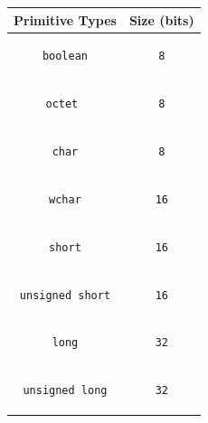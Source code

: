 \begin{table}
\begin{center}
{\small
\begin{tabular}{|c|c|}
\hline 
{\textbf{Primitive Types}} &  \textbf{ Size (bits) }\\ 
\hline 
\begin{lstlisting}
boolean
\end{lstlisting} & 
\begin{lstlisting}
8
\end{lstlisting} \\ \hline 
\begin{lstlisting}
octet 
\end{lstlisting}  & 
\begin{lstlisting}
8
\end{lstlisting} \\ \hline 
\begin{lstlisting} 
char
\end{lstlisting}   & 
\begin{lstlisting}
8
\end{lstlisting} \\ \hline 
\begin{lstlisting}
wchar
\end{lstlisting}   &
\begin{lstlisting}
16
\end{lstlisting} \\ \hline 
\begin{lstlisting}
short
\end{lstlisting}   &
\begin{lstlisting}
16
\end{lstlisting} \\ \hline 
\begin{lstlisting}
unsigned short
\end{lstlisting}  & 
\begin{lstlisting}
16
\end{lstlisting} \\ \hline 
\begin{lstlisting}
long
\end{lstlisting}  &
\begin{lstlisting}
32
\end{lstlisting} \\ \hline 

\begin{lstlisting}
unsigned long
\end{lstlisting}  &
\begin{lstlisting}
32
\end{lstlisting} \\ \hline 


\end{tabular}}
\end{center}
\end{table}
